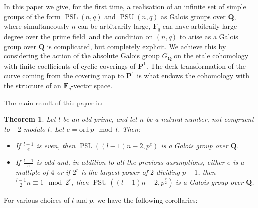 \documentclass{article}
\newtheorem{theorem}{Theorem}
\theoremstyle{definition}
\DeclareMathOperator{\PSL}{\mathrm{PSL}}
\DeclareMathOperator{\PSU}{\mathrm{PSU}}
\begin{document}
	In this paper we give, for the first time, a realisation of an infinite set of simple groups of the form $\PSL(n, q)$ and $\PSU(n, q)$ as Galois groups over $\mathbf{Q}$, where simultaneously $n$ can be arbitrarily large, $\mathbf{F}_q$ can have arbitraily large degree over the prime field, and the condition on $(n,q)$ to arise as a Galois group over $\mathbf{Q}$ is complicated, but completely explicit. We achieve this by considering the action of the absolute Galois group $G_{\mathbf{Q}}$ on the etale cohomology with finite coefficients of cyclic coverings of $\mathbf{P}^1$. The deck transformation of the curve coming from the covering map to $\mathbf{P}^1$ is what endows the cohomology with the structure of an $\mathbf{F}_q$-vector space. \par 
	The main result of this paper is: 
	\begin{theorem} \label{final}
		Let $l$ be an odd prime, and let $n$ be a natural number, not congruent to $-2$ modulo $l$. Let $e = \mathrm{ord} \ p \mod l$. Then:
		\begin{itemize}
			\item If $\frac{l-1}{e}$ is even, then $\PSL((l-1)n-2,p^e)$ is a Galois group over $\mathbf{Q}$.
			\item If $\frac{l-1}{e}$ is odd and, in addition to all the previous assumptions, either $e$ is a multiple of $4$ or if $2^r$ is the largest power of $2$ dividing $p+1$, then $\frac{l-1}{2}n \equiv 1 \mod 2^r$, then $\PSU((l-1)n - 2, p^{\frac{e}{2}})$ is a Galois group over $\mathbf{Q}$.
		\end{itemize}
	\end{theorem}
	For various choices of $l$ and $p$, we have the following corollaries:
\end{document}

